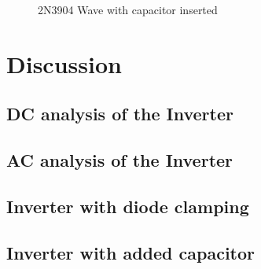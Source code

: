 \documentclass[10pt]{report}
\begin{document}
		\begin{figure}[H]
			\caption{2N3904 Wave with capacitor inserted}
		\end{figure}


\section{Discussion}

\subsection{DC analysis of the Inverter}

\subsection{AC analysis of the Inverter}

\subsection{Inverter with diode clamping}

\subsection{Inverter with added capacitor}


%
\end{document}
